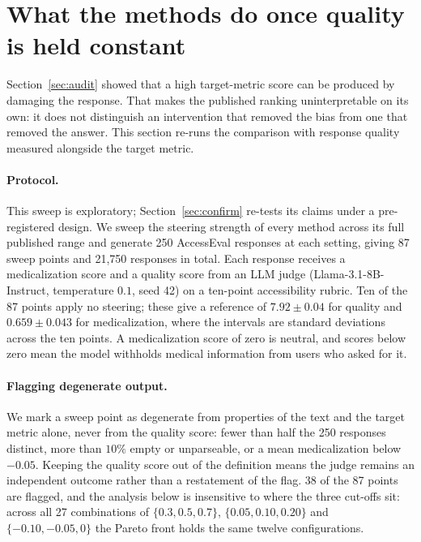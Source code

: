 %

\section{What the methods do once quality is held constant}
\label{sec:frontier}

Section~\ref{sec:audit} showed that a high target-metric score can be produced by
damaging the response. That makes the published ranking uninterpretable on its own:
it does not distinguish an intervention that removed the bias from one that removed
the answer. This section re-runs the comparison with response quality measured
alongside the target metric.

\paragraph{Protocol.} This sweep is exploratory; Section~\ref{sec:confirm} re-tests its
claims under a pre-registered design. We sweep the steering strength of every method across its full
published range and generate 250 AccessEval responses at each setting, giving 87 sweep
points and 21{,}750 responses in total. Each response receives a medicalization score
and a quality score from an LLM judge (Llama-3.1-8B-Instruct, temperature $0.1$, seed
42) on a ten-point accessibility rubric. Ten of the 87 points apply no steering; these
give a reference of $7.92 \pm 0.04$ for quality and $0.659 \pm 0.043$ for
medicalization, where the intervals are standard deviations across the ten points. A
medicalization score of zero is neutral, and scores below zero mean the model withholds
medical information from users who asked for it.

\paragraph{Flagging degenerate output.} We mark a sweep point as degenerate from
properties of the text and the target metric alone, never from the quality score: fewer
than half the 250 responses distinct, more than $10\%$ empty or unparseable, or a mean
medicalization below $-0.05$. Keeping the quality score out of the definition means the
judge remains an independent outcome rather than a restatement of the flag. 38 of the
87 points are flagged, and the analysis below is insensitive to where the three cut-offs
sit: across all 27 combinations of $\{0.3, 0.5, 0.7\}$, $\{0.05, 0.10, 0.20\}$ and
$\{-0.10, -0.05, 0\}$ the Pareto front holds the same twelve configurations.

